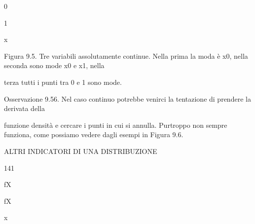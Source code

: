 \documentclass[a4paper,portrait,12pt]{article}
\begin{document}
0





1





\begin{flushleft}
x
\end{flushleft}





\begin{flushleft}
Figura 9.5. Tre variabili assolutamente continue. Nella prima la moda \`{e} x0, nella seconda sono mode x0 e x1, nella
\end{flushleft}


\begin{flushleft}
terza tutti i punti tra 0 e 1 sono mode.
\end{flushleft}





\begin{flushleft}
Osservazione 9.56. Nel caso continuo potrebbe venirci la tentazione di prendere la derivata della
\end{flushleft}


\begin{flushleft}
funzione densit\`{a} e cercare i punti in cui si annulla. Purtroppo non sempre funziona, come possiamo vedere dagli esempi in Figura 9.6.
\end{flushleft}





\begin{flushleft}
 ALTRI INDICATORI DI UNA DISTRIBUZIONE
\end{flushleft}





141





\begin{flushleft}
fX
\end{flushleft}





\begin{flushleft}
fX
\end{flushleft}





\begin{flushleft}
x
\end{flushleft}
\end{document}
